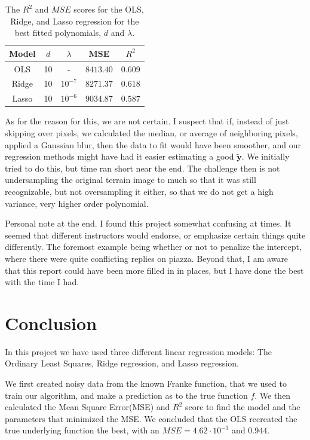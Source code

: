 \documentclass[a4paper,10pt,english]{article}
\begin{document}
\begin{table}[t]
	\centering
	\begin{threeparttable}
		\centering
		\caption{The $R^2$ and $MSE$ scores for the OLS, Ridge, and Lasso regression for the best fitted polynomials, $d$ and $\lambda$.}
		\label{tab:2}
		\begin{tabular}{ccccc}
			\toprule\toprule
			Model & $d$ & $\lambda$ & MSE & $R^2$\\
			\midrule
			OLS			& 10 	& - 	&$8413.40$ & 0.609\\
			Ridge		& 10 	& $10^{-7}$ &$8271.37$ &0.618 \\
			Lasso		& 10 	& $10^{-6}$ & $9034.87$ &$0.587$ \\
			\bottomrule\bottomrule
		\end{tabular}
	\end{threeparttable}
\end{table}

As for the reason for this, we are not certain. I suspect that if, instead of just skipping over pixels, we calculated the median, or average of neighboring pixels, applied a Gaussian blur, then the data to fit would have been smoother, and our regression methods might have had it easier estimating a good $\bm{\tilde y}$. 
We initially tried to do this, but time ran short near the end. The challenge then is not undersampling the original terrain image to much so that it was still recognizable, but not oversampling it either, so that we do not get a high variance, very higher order polynomial.

Personal note at the end. I found this project somewhat confusing at times. It seemed that different instructors would endorse, or emphasize certain things quite differently. The foremost example being whether or not to penalize the intercept, where there were quite conflicting replies on piazza. Beyond that, I am aware that this report could have been more filled in in places, but I have done the best with the time I had.
 
\section{Conclusion}\label{sec:conclussion}
In this project we have used three different linear regression models: The Ordinary Least Squares, Ridge regression, and Lasso regression. 

We first created noisy data from the known Franke function, that we used to  train our algorithm, and make a prediction as to the true function $f$. We then calculated the Mean Square Error(MSE) and $R^2$ score to find the model and the parameters that minimized the MSE. We concluded that the OLS recreated the true underlying function the best, with an $MSE=4.62\cdot10^{-3}$ and $0.944$.
\end{document}
